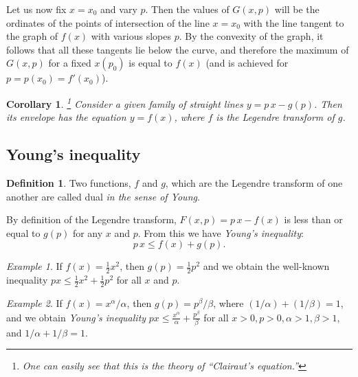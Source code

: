\documentclass[leqno]{report}
\numberwithin{equation}{section}
\theoremstyle{plain}
\newtheorem*{cor*}{Corollary}
\let\oldendproof\endproof
\renewenvironment{proof}[1][\proofname]{%
  \oldproof[\textsc{#1}]%
}{\oldendproof}
\theoremstyle{definition}
\newtheorem*{defn*}{Definition}
\theoremstyle{remark}
\theoremstyle{smallcap}
\newtheorem{ex}{Example}
\numberwithin{prob}{section}
\begin{document}
\begin{proof}
  Let us now fix $x = x_0$ and vary $p$.
  Then the values of $G(x, p)$ will be the ordinates
  of the points of intersection of the line $x = x_0$
  with the line tangent to the graph of $f(x)$
  with various slopes $p$.
  By the convexity of the graph,
  it follows that all these tangents
  lie below the curve,
  and therefore the maximum of $G(x, p)$
  for a fixed $x(p_0)$ is equal to $f(x)$
  (and is achieved for $p = p(x_0) = f'(x_0)$).
\end{proof}

\begin{cor*}\footnote{
    One can easily see that
    this is the theory of ``Clairaut's equation.''
  }
  Consider a given family of straight lines
  $y = p \, x - g(p)$.
  Then its envelope has the equation
  $y = f(x)$,
  where $f$ is the Legendre transform of $g$.
\end{cor*}

\subsection{Young's inequality}

\begin{defn*}
  Two functions, $f$ and $g$,
  which are the Legendre transform
  of one another are called dual
  \emph{in the sense of Young}.
\end{defn*}

By definition of the Legendre transform,
$F(x, p) = p \, x - f(x)$ is less than
or equal to $g(p)$ for any $x$ and $p$.
From this we have \emph{Young's inequality}:
$$
p \, x \le f(x) + g(p).
$$

\setcounter{ex}{0}
\begin{ex}
If $f(x) = \frac{1}{2} x^2$,
then $g(p) = \frac{1}{2} p^2$
and we obtain the well-known inequality
$px \le \frac 1 2 x^2 + \frac 1 2 p^2$
for all $x$ and $p$.
\end{ex}

\begin{ex}
  If $f(x) = x^\alpha/\alpha$,
  then $g(p) = p^\beta/\beta$,
  where $(1/\alpha) + (1/\beta) = 1$,
  and we obtain \emph{Young's inequality}
  $px \le \frac{x^\alpha}{\alpha} + \frac{p^\beta}{\beta}$
  for all $x > 0, p > 0, \alpha > 1, \beta > 1$,
  and $1/\alpha + 1/\beta = 1$.
\end{ex}
\end{document}
